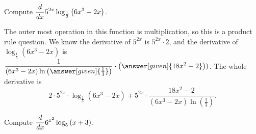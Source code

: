 \documentclass{ximera}
\begin{document}
\begin{example}
	Compute $\displaystyle \frac{d}{\mathop{}\!d x} 5^{2x} \log_{\frac{1}{3}}\left( 6x^3-2x\right)$.
	\begin{explanation}
		The outer most operation in this function is multiplication, so this is a product rule question.  We know the derivative of $5^{2x}$ is $5^{2x} \cdot 2$, and the derivative of
		$\log_{\frac{1}{3}}\left(6x^3 - 2x \right)$ is $\displaystyle \dfrac{1}{(6x^3-2x) \ln\left(\answer[given]{\frac{1}{3}}\right)} \cdot \left(\answer[given]{18x^2-2}\right))$.  The whole derivative is
		\[ 2 \cdot 5^{2x}\cdot \log_{\frac{1}{3}}\left( 6x^3-2x\right) + 5^{2x}\cdot \dfrac{18x^2-2}{(6x^3-2x)\ln\left(\frac{1}{3}\right)} . \]
	\end{explanation}
\end{example}

\begin{question}
	Compute $\displaystyle \frac{d}{\mathop{}\!d x} 6^{x^2} \log_5\left(x+3\right)$.
	\begin{multipleChoice}
	\end{multipleChoice}
\end{question}
\end{document}

